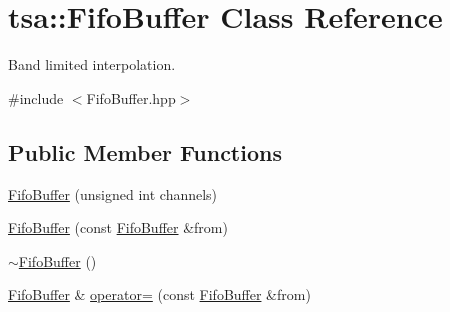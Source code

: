 \hypertarget{classtsa_1_1_fifo_buffer}{}\section{tsa\+:\+:Fifo\+Buffer Class Reference}
\label{classtsa_1_1_fifo_buffer}


Band limited interpolation.  




{\ttfamily \#include $<$Fifo\+Buffer.\+hpp$>$}

\subsection*{Public Member Functions}
\begin{DoxyCompactItemize}
\item 
\hyperlink{classtsa_1_1_fifo_buffer_ad30fe947e5c2b34614859cbf12d749f1}{Fifo\+Buffer} (unsigned int channels)
\item 
\hyperlink{classtsa_1_1_fifo_buffer_ac6a76ca0fd208c80de6e4e04d5c43173}{Fifo\+Buffer} (const \hyperlink{classtsa_1_1_fifo_buffer}{Fifo\+Buffer} \&from)
\item 
\hyperlink{classtsa_1_1_fifo_buffer_ad7bec7c4fc528a12763f29c8f6a8e460}{$\sim$\+Fifo\+Buffer} ()
\item 
\hyperlink{classtsa_1_1_fifo_buffer}{Fifo\+Buffer} \& \hyperlink{classtsa_1_1_fifo_buffer_ad3c89a0f4aa3e475e136ec8c47f2165e}{operator=} (const \hyperlink{classtsa_1_1_fifo_buffer}{Fifo\+Buffer} \&from)
\end{DoxyCompactItemize}
